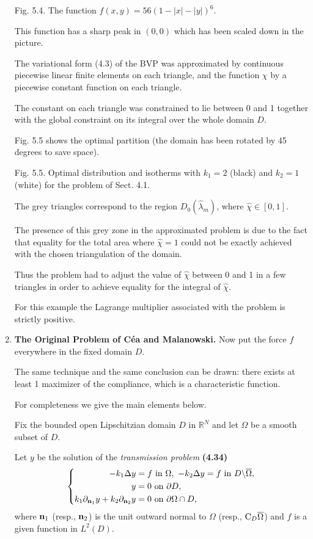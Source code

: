 \documentclass{book}
\numberwithin{equation}{section}
\begin{document}
\begin{enumerate}
    \textsf{Fig. 5.4. The function $f(x,y) = 56\left(1 - |x| - |y|\right)^6$.}
    
    This function has a sharp peak in $(0,0)$ which has been scaled down in the picture.
    
    The variational form (4.3) of the BVP was approximated by continuous piecewise linear finite elements on each triangle, and the function $\chi$ by a piecewise constant function on each triangle.
    
    The constant on each triangle was constrained to lie between 0 and 1 together with the global constraint on its integral over the whole domain $D$.
    
    Fig. 5.5 shows the optimal partition (the domain has been rotated by 45 degrees to save space).
    
    \textsf{Fig. 5.5. Optimal distribution and isotherms with $k_1 = 2$ (black) and $k_2 = 1$ (white) for the problem of Sect. 4.1.}
    
    The grey triangles correspond to the region $D_0(\hat{\lambda}_m)$, where $\hat{\chi}\in[0,1]$.
    
    The presence of this grey zone in the approximated problem is due to the fact that equality for the total area where $\hat{\chi} = 1$ could not be exactly achieved with the chosen triangulation of the domain.
    
    Thus the problem had to adjust the value of $\hat{\chi}$ between 0 and 1 in a few triangles in order to achieve equality for the integral of $\hat{\chi}$.
    
    For this example the Lagrange multiplier associated with the problem is strictly positive.
    \item \textbf{The Original Problem of Céa and Malanowski.} Now put the force $f$ everywhere in the fixed domain $D$.
    
    The same technique and the same conclusion can be drawn: there exists at least 1 maximizer of the compliance, which is a characteristic function.
    
    For completeness we give the main elements below.
    
    Fix the bounded open Lipschitzian domain $D$ in $\mathbb{R}^N$ and let $\Omega$ be a smooth subset of $D$.
    
    Let $y$ be the solution of the \textit{transmission problem} \textbf{(4.34)}
    \begin{equation*}
        \left\{\begin{split}
            -k_1\Delta y &= f \mbox{ in } \Omega,\ -k_2\Delta y = f \mbox{ in } D\backslash\overline{\Omega},\\
            y &= 0 \mbox{ on } \partial D,\\
            k_1\partial_{{\bf n}_1}y + k_2\partial_{{\bf n}_2}y &= 0 \mbox{ on } \partial\Omega\cap D,
        \end{split}\right.
    \end{equation*}
    where ${\bf n}_1$ (resp., ${\bf n}_2$) is the unit outward normal to $\Omega$ (resp., ${\rm C}_D\overline{\Omega}$) and $f$ is a given function in $L^2(D)$.
    

\end{enumerate}
\end{document}
